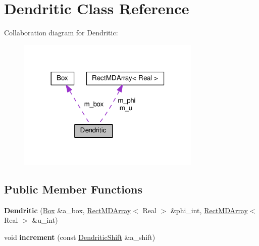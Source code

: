 \hypertarget{classDendritic}{}\section{Dendritic Class Reference}
\label{classDendritic}


Collaboration diagram for Dendritic\+:\nopagebreak
\begin{figure}[H]
\begin{center}
\leavevmode
\includegraphics[width=248pt]{classDendritic__coll__graph}
\end{center}
\end{figure}
\subsection*{Public Member Functions}
\begin{DoxyCompactItemize}
\item 
\hypertarget{classDendritic_afefc8047c94056afaa56617c24518a1e}{}{\bfseries Dendritic} (\hyperlink{classBox}{Box} \&a\+\_\+box, \hyperlink{classRectMDArray}{Rect\+M\+D\+Array}$<$ Real $>$ \&phi\+\_\+int, \hyperlink{classRectMDArray}{Rect\+M\+D\+Array}$<$ Real $>$ \&u\+\_\+int)\label{classDendritic_afefc8047c94056afaa56617c24518a1e}

\item 
\hypertarget{classDendritic_a152a728fd7bac656f0d322d0e844dec8}{}void {\bfseries increment} (const \hyperlink{classDendriticShift}{Dendritic\+Shift} \&a\+\_\+shift)\label{classDendritic_a152a728fd7bac656f0d322d0e844dec8}

\end{DoxyCompactItemize}
